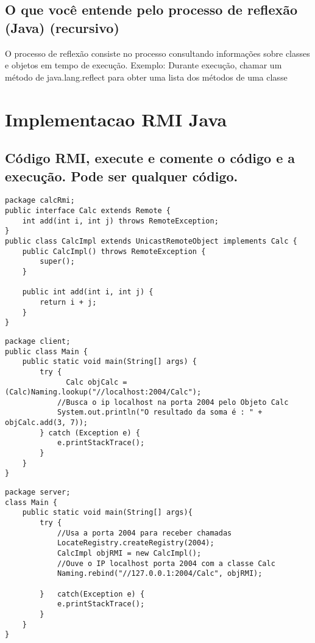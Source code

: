 \documentclass[12pt]{article}
\begin{document}
\subsection{O que você entende pelo processo de reflexão (Java) (recursivo)} 
O processo de reflexão consiste no processo consultando informações sobre classes e objetos em tempo de execução. Exemplo: Durante execução, chamar um método de java.lang.reflect para obter uma lista dos métodos de uma classe

\section{Implementacao RMI Java}\label{sec:impl_rmi}

\subsection{Código RMI, execute e comente o código e a execução. Pode ser qualquer código.}

\begin{lstlisting}[caption={Classe CalcImpl e Calc}, label=lst:calc_rmi]
package calcRmi;
public interface Calc extends Remote {
    int add(int i, int j) throws RemoteException;
}
public class CalcImpl extends UnicastRemoteObject implements Calc {
    public CalcImpl() throws RemoteException {
        super();
    }

    public int add(int i, int j) {
        return i + j;
    }
}
\end{lstlisting}

\begin{lstlisting}[caption={Cliente}, label=lst:calc_rmi_client]
package client;
public class Main {
	public static void main(String[] args) {
		try {
		      Calc objCalc = (Calc)Naming.lookup("//localhost:2004/Calc"); 
			//Busca o ip localhost na porta 2004 pelo Objeto Calc
            System.out.println("O resultado da soma é : " + objCalc.add(3, 7));
		} catch (Exception e) {
			e.printStackTrace();
		}
	}
}
\end{lstlisting}

\begin{lstlisting}[caption={Servidor}, label=lst:calc_rmi_server]
package server;
class Main {
	public static void main(String[] args){
		try {
			//Usa a porta 2004 para receber chamadas
			LocateRegistry.createRegistry(2004); 
			CalcImpl objRMI = new CalcImpl();
			//Ouve o IP localhost porta 2004 com a classe Calc
			Naming.rebind("//127.0.0.1:2004/Calc", objRMI);

		}	catch(Exception e) {
			e.printStackTrace();
		}
	}
}
\end{lstlisting}
\end{document}
